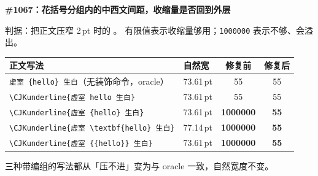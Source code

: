 \documentclass[11pt]{article}
\begin{document}
{\bfseries \#1067：花括号分组内的中西文间距，收缩量是否回到外层}

\smallskip
判据：把正文压窄 2\,pt 时的 \texttt{\string\badness}。
有限值表示收缩量够用；\texttt{1000000} 表示不够、会溢出。

\medskip
\begin{tabular}{@{}llcc@{}}
\toprule
正文写法 & 自然宽 & 修复前 & 修复后 \\
\midrule
\verb|虚室 {hello} 生白|（无装饰命令，oracle） & 73.61\,pt & 55 & 55 \\
\verb|\CJKunderline{虚室 hello 生白}| & 73.61\,pt & 55 & 55 \\
\addlinespace
\verb|\CJKunderline{虚室 {hello} 生白}| & 73.61\,pt & \textbf{1000000} & \textbf{55} \\
\verb|\CJKunderline{虚室 \textbf{hello} 生白}| & 77.14\,pt & \textbf{1000000} & \textbf{55} \\
\verb|\CJKunderline{虚室 {{hello}} 生白}| & 73.61\,pt & \textbf{1000000} & \textbf{55} \\
\bottomrule
\end{tabular}

\medskip
三种带编组的写法都从「压不进」变为与 oracle 一致，自然宽度不变。
\end{document}
